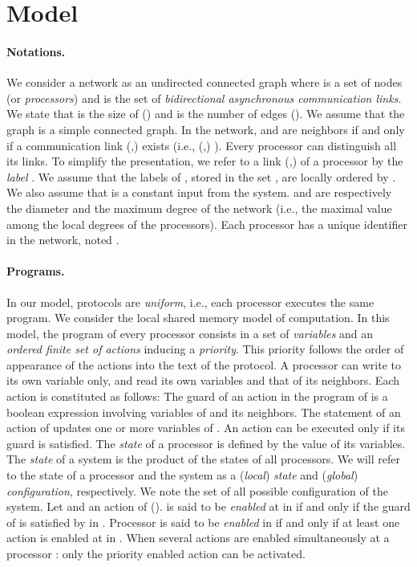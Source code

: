 \documentclass[11pt,letterpaper,onecolumn]{article}
\begin{document}
\section{Model}
\label{sec:model}

\paragraph{Notations.}
We consider a network as an undirected connected graph  where  is a set of nodes (or {\em processors}) and  is the set of {\em bidirectional asynchronous communication links}. We state that  is the size of  () and  is the number of edges (). We assume that the graph  is a simple connected graph. In the network,  and  are neighbors if and only if a communication link (,) exists (i.e., (,)  ). Every processor  can distinguish all its links. To simplify the presentation, we refer to a link (,) of a processor  by the {\em label} . We assume that the labels of , stored in the set , are locally ordered by . We also assume that  is a constant input from the system.  and  are respectively the diameter and the maximum degree of the network (i.e., the maximal value among the local degrees of the processors). Each processor  has a unique identifier in the network, noted .

\paragraph{Programs.}In our model, protocols are {\em uniform}, i.e., each processor executes the same program. We consider the local shared memory model of computation. In this model, the program of every processor consists in a set of {\em variables} and an {\em ordered finite set of actions} inducing a {\em priority}. This priority follows the order of appearance of the actions into the text of the protocol. A processor can write to its own variable only, and read its own variables and that of its neighbors. Each action is constituted as follows:  The guard of an action in the program of  is a boolean expression involving variables of  and its neighbors. The statement of an action of  updates one or more variables of . An action can be executed only if its guard is satisfied. The {\em state} of a processor is defined by the value of its variables. The {\em state} of a system is the product of the states of all processors. We will refer to the state of 
a processor and the system as a ({\em local}) {\em state} and ({\em global}) {\em configuration}, respectively. We note  the set of all possible configuration of the system. Let  and  an action of  ().  is said to be {\em enabled} at  in  if and only if the guard of  is satisfied by  in . Processor  is said to be {\em enabled} in  if and only if at least one action is enabled at  in . When several actions are enabled simultaneously at a processor : only the priority enabled action can be activated.
\end{document}
